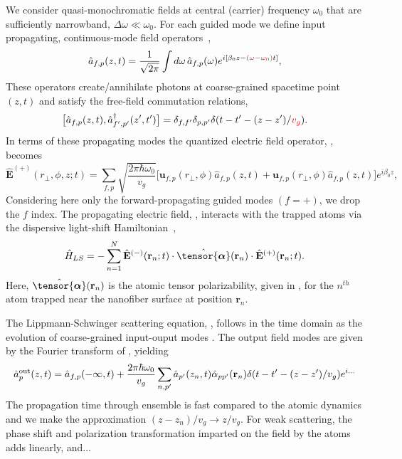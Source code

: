 \documentclass[preprint,aps,pra,onecolumn]{revtex4-1} %
\newcommand{\poltens}{\hat{\tensor{\boldsymbol{\alpha}}}}
\newcommand{\change}[1]{{\color{RoyalBlue} #1}}
\newcommand{\comment}[1]{{\color{Maroon} #1}}
\newcommand{\error}[1]{{\color{red} #1}}
\begin{document}
We consider quasi-monochromatic fields at central (carrier) frequency $\omega_0$ that are sufficiently narrowband, $\Delta \omega \ll \omega_0$. For each guided mode we define input propagating, continuous-mode field operators~\cite{blow_continuum_1990, le_kien_correlations_2008},
	\begin{align}
		\hat{a}_{f,p}(z,t) =\frac{1}{\sqrt{2 \pi}}  \int d \omega \, \hat{a}_{f,p}(\omega) e^{i[ \beta_0 z- \comment{(\omega-\omega_0)} t ]}, 
	\end{align}
These operators create/annihilate photons at coarse-grained spacetime point $(z,t)$ and satisfy the free-field commutation relations,
	\begin{equation} \label{Eq::InputOutputCommutation}
		\big[\hat{a}_{f,p}(z,t),\hat{a}^\dag_{f',p'}(z',t')\big]=\delta_{f,f'}\delta_{p,p'}  \delta(t-t'-(z-z')/\error{v_g}).
	\end{equation}
In terms of these propagating modes the quantized electric field operator, , becomes
	\begin{equation} \label{Eq::PropagatingElectricField}
		\hat{\mathbf{E}}^{(+)}(r\!_\perp,\phi,z;t) = \sum_{f,p} \sqrt{ \frac{2 \pi \hbar \omega_0}{ v_g} } \big[ \mathbf{u}_{f,p}(r\!_\perp,\phi) \hat{a}_{f,p}(z,t) + \mathbf{u}_{f,p}(r\!_\perp,\phi) \hat{a}_{f,p}(z,t) \big] e^{i \beta_0 z},
	\end{equation}	
Considering here only the forward-propagating guided modes $(f=+)$, we  drop the $f$ index.  The propagating electric field, , interacts with the trapped atoms via the dispersive light-shift Hamiltonian~\cite{deutsch_quantum_2010,kien_dynamical_2013},
	\begin{equation} \label{Eq::LightShiftHam}
		\hat{H}_{LS} = - \sum_{n=1}^N \hat{\mathbf{E}}^{(-)}(\mathbf{r}_n ; t ) \cdot \poltens(\mbf{r}_n) \cdot \hat{\mathbf{E}}^{(+)}(\mathbf{r}_n ;t ).
	\end{equation}
Here, $\poltens(\br_n)$ is the atomic tensor polarizability, given in , for the $n^{th}$ atom trapped near the nanofiber surface at position $\mathbf{r}_n$. 

The Lippmann-Schwinger scattering equation, , follows in the time domain as the evolution of \error{coarse-grained} input-ouput modes \cite{gardiner_input_1985, fan_input-output_2010, le_kien_propagation_2014}.  The output field modes are given by the Fourier transform of , yielding \cite{le_kien_correlations_2008} \change{
	\begin{align} \label{Eq::ScatteringSolution}
		\hat{a}^{\rm out}_{p}(z,t) = \hat{a}_{f,p}(-\infty,t) + \frac{2\pi \hbar \omega_0}{v_g} \sum_{n,p'} \hat{a}_{p'}(z_n,t) \hat{\alpha}_{pp'}(\mathbf{r}_n) \delta(t-t'- (z-z')/v_g)e^{i\dots}
	\end{align} 
The propagation time through ensemble is fast compared to the atomic dynamics and we make the approximation $(z-z_n)/v_g \rightarrow z/v_g$.  For weak scattering, the phase shift and polarization transformation imparted on the field by the atoms adds linearly, and...}
\end{document}
